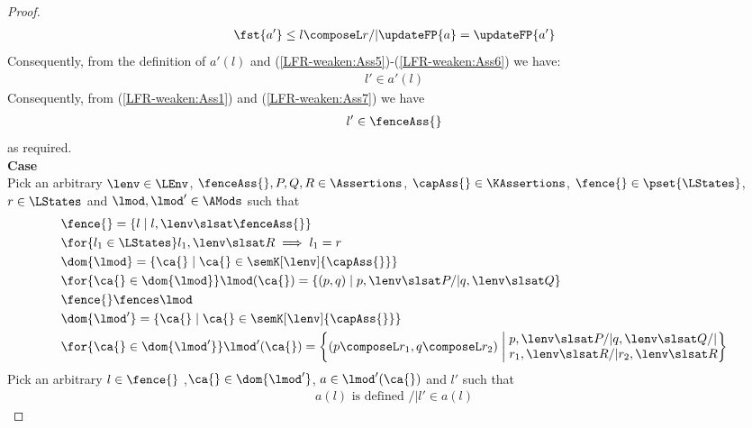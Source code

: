 \begin{lemma}
\begin{proof}
%
\begin{align}
	\fst{a'} \leq l \composeL r /| \updateFP{a} = \updateFP{a'}\label{LFR-weaken:Ass6}
\end{align}
%
Consequently, from the definition of $a'(l)$ and (\ref{LFR-weaken:Ass5})-(\ref{LFR-weaken:Ass6}) we have:
%
\begin{align}
	l' \in a'(l)
	\label{LFR-weaken:Ass7}
\end{align}
%
Consequently, from (\ref{LFR-weaken:Ass1}) and (\ref{LFR-weaken:Ass7}) we have
%
\begin{align*}
	l' \in \fenceAss{} 
\end{align*}
%
as required.\\
%
%
%
%
%

\noindent\textbf{Case }\\
Pick an arbitrary $\lenv \in \LEnv$, $\fenceAss{}, P, Q, R \in \Assertions$, $\capAss{} \in \KAssertions$, $\fence{} \in \pset{\LStates}$, $r \in \LStates$ and $\lmod, \lmod' \in \AMods$ such that 
%
\begin{align}
	& \fence{} = \left\{ l \mid l, \lenv \slsat \fenceAss{} \right\} \nonumber\\
	& \for{l_1 \in \LStates} l_1, \lenv \slsat R \implies l_1 = r  \label{LFR-exact:Ass1}\\
	& \dom{\lmod} = \left\{ \ca{} \mid \ca{} \in \semK[\lenv]{\capAss{}} \right\} \label{LFR-exact:Ass2}\\
	& \for{\ca{} \in \dom{\lmod}} \lmod(\ca{}) = \left\{ (p, q) \mid p, \lenv \slsat P /| q, \lenv \slsat Q \right\} \label{LFR-exact:Ass3}\\
	& \fence{} \fences \lmod \label{LFR-exact:Ass4}\\
	& \dom{\lmod'} = \left\{ \ca{} \mid \ca{} \in \semK[\lenv]{\capAss{}} \right\} \label{LFR-exact:Ass5}\\
	& \for{\ca{} \in \dom{\lmod'}} \lmod'(\ca{}) = 
		\left\{ (p \composeL r_1, q \composeL r_2) \;\middle| \;
			\begin{array}{@{} l @{}}
				p, \lenv \slsat P /| q, \lenv \slsat Q /| \\
				r_1, \lenv \slsat R /| r_2, \lenv \slsat R
			\end{array}
		\right\} \label{LFR-exact:Ass6}
\end{align}
%
Pick an arbitrary $l \in \fence{}$ ,$\ca{} \in \dom{\lmod'}$, $a \in \lmod'(\ca{})$ and $l'$ such that 
%
\begin{align}
	a(l) \text{ is defined } /| l' \in a(l) \label{LFR-exact:Ass7}
\end{align}

\end{proof}
\end{lemma}
